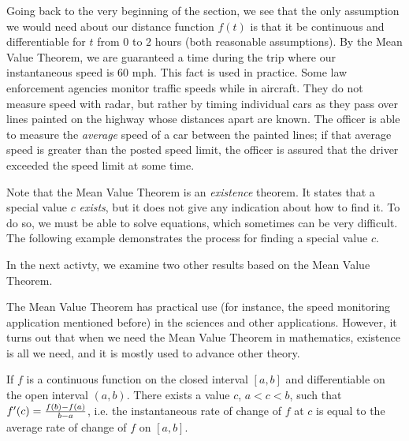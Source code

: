 Going back to the very beginning of the section, we see that the only assumption we would need about our distance function $f(t)$ is that it be continuous and differentiable for $t$ from $0$ to $2$ hours (both reasonable assumptions).  By the Mean Value Theorem, we are guaranteed a time during the trip where our instantaneous speed is $60$ mph. This fact is used in practice. Some law enforcement agencies monitor traffic speeds while in aircraft. They do not measure speed with radar, but rather by timing individual cars as they pass over lines painted on the highway whose distances apart are known. The officer is able to measure the \textit{average} speed of a car between the painted lines; if that average speed is greater than the posted speed limit, the officer is assured that the driver exceeded the speed limit at some time.

Note that the Mean Value Theorem is an \textit{existence} theorem. It states that a special value $c$ \textit{exists}, but it does not give any indication about how to find it.  To do so, we must be able to solve equations, which sometimes can be very difficult.  The following example demonstrates the process for finding a special value $c$.


In the next activty, we examine two other results based on the Mean Value Theorem.

The Mean Value Theorem has practical use (for instance, the speed monitoring application mentioned before) in the sciences and other applications.  However, it turns out that when we need the Mean Value Theorem in mathematics, existence is all we need, and it is mostly used to advance other theory.

\begin{summary}
\item If $f$ is a continuous function on the closed interval $[a,b]$ and differentiable on the open interval $(a,b)$. There exists a value $c$, $a < c < b$, such that $f'(c) = \frac{f(b)-f(a)}{b-a}$, i.e. the instantaneous rate of change of $f$ at $c$ is equal to the average rate of change of $f$ on $[a,b]$.
\end{summary}

 

\cleardoublepage